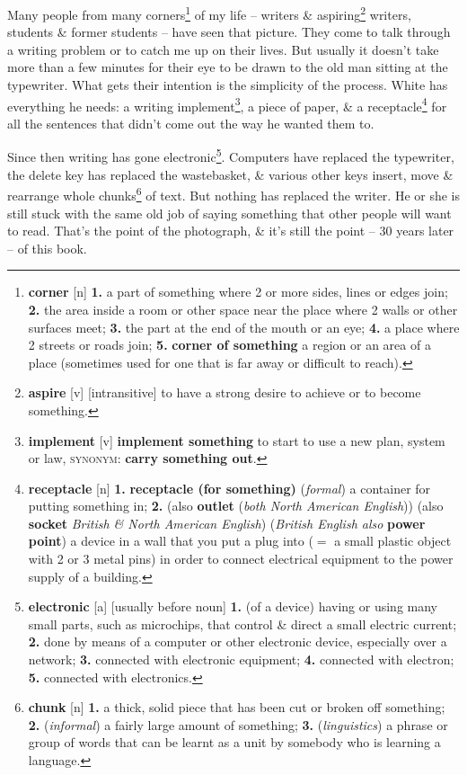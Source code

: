 \documentclass[oneside]{book}
\numberwithin{equation}{section}
\begin{document}
Many people from many corners\footnote{\textbf{corner} [n] \textbf{1.} a part of something where 2 or more sides, lines or edges join; \textbf{2.} the area inside a room or other space near the place where 2 walls or other surfaces meet; \textbf{3.} the part at the end of the mouth or an eye; \textbf{4.} a place where 2 streets or roads join; \textbf{5.} \textbf{corner of something} a region or an area of a place (sometimes used for one that is far away or difficult to reach).} of my life -- writers \& aspiring\footnote{\textbf{aspire} [v] [intransitive] to have a strong desire to achieve or to become something.} writers, students \& former students -- have seen that picture. They come to talk through a writing problem or to catch me up on their lives. But usually it doesn't take more than a few minutes for their eye to be drawn to the old man sitting at the typewriter. What gets their intention is the simplicity of the process. White has everything he needs: a writing implement\footnote{\textbf{implement} [v] \textbf{implement something} to start to use a new plan, system or law, \textsc{synonym}: \textbf{carry something out}.}, a piece of paper, \& a receptacle\footnote{\textbf{receptacle} [n] \textbf{1.} \textbf{receptacle (for something)} (\textit{formal}) a container for putting something in; \textbf{2.} (also \textbf{outlet} (\textit{both North American English})) (also \textbf{socket} \textit{British \& North American English}) (\textit{British English also} \textbf{power point}) a device in a wall that you put a plug into ($=$ a small plastic object with 2 or 3 metal pins) in order to connect electrical equipment to the power supply of a building.} for all the sentences that didn't come out the way he wanted them to.

Since then writing has gone electronic\footnote{\textbf{electronic} [a] [usually before noun] \textbf{1.} (of a device) having or using many small parts, such as microchips, that control \& direct a small electric current; \textbf{2.} done by means of a computer or other electronic device, especially over a network; \textbf{3.} connected with electronic equipment; \textbf{4.} connected with electron; \textbf{5.} connected with electronics.}. Computers have replaced the typewriter, the delete key has replaced the wastebasket, \& various other keys insert, move \& rearrange whole chunks\footnote{\textbf{chunk} [n] \textbf{1.} a thick, solid piece that has been cut or broken off something; \textbf{2.} (\textit{informal}) a fairly large amount of something; \textbf{3.} (\textit{linguistics}) a phrase or group of words that can be learnt as a unit by somebody who is learning a language.} of text. But nothing has replaced the writer. He or she is still stuck with the same old job of saying something that other people will want to read. That's the point of the photograph, \& it's still the point -- 30 years later -- of this book.
\end{document}
